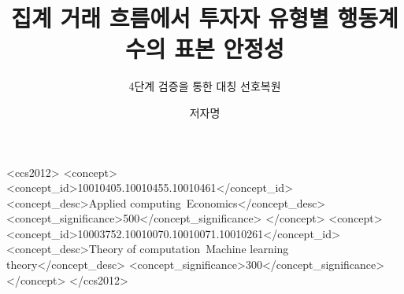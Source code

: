 \documentclass[sigconf,nonacm]{acmart}
\begin{document}
\title{집계 거래 흐름에서 투자자 유형별 행동계수의 표본 안정성}
\subtitle{4단계 검증을 통한 대칭 선호복원}

\author{저자명}
\renewcommand{\shortauthors}{저자명}

\begin{CCSXML}
<ccs2012>
<concept>
<concept_id>10010405.10010455.10010461</concept_id>
<concept_desc>Applied computing~Economics</concept_desc>
<concept_significance>500</concept_significance>
</concept>
<concept>
<concept_id>10003752.10010070.10010071.10010261</concept_id>
<concept_desc>Theory of computation~Machine learning theory</concept_desc>
<concept_significance>300</concept_significance>
</concept>
</ccs2012>
\end{CCSXML}



\maketitle





\end{document}
